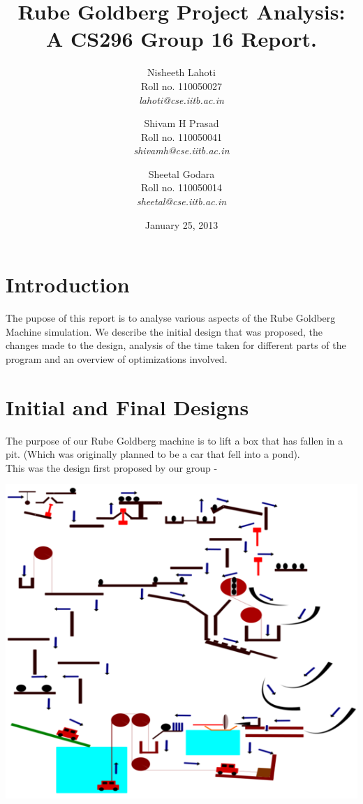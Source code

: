 \documentclass[a4paper,11pt]{article}
\begin{document}
	\title{\textbf{Rube Goldberg Project Analysis:\\ A CS296 Group 16 Report.}}
	
	\author {
		Nisheeth Lahoti\\ Roll no. 110050027\\ \emph{lahoti@cse.iitb.ac.in}
		\and Shivam H Prasad\\ Roll no. 110050041\\ \emph{shivamh@cse.iitb.ac.in}
		\and Sheetal Godara\\ Roll no. 110050014\\ \emph{sheetal@cse.iitb.ac.in}
	}
	
	\date{January 25, 2013}
	\maketitle
	
	\section{Introduction}
		The pupose of this report is to analyse various aspects of the Rube
		Goldberg Machine simulation. We describe the initial design that was
		proposed, the changes made to the design, analysis of the time taken for
		different parts of the program and an overview of optimizations involved.
	
	\section{Initial and Final Designs}
		The purpose of our Rube Goldberg machine is to lift a box that has fallen
		in a pit. (Which was originally planned to be  a car that fell into a
		pond).\\
		
		This was the design first proposed by our group -
			\begin{center}
				\includegraphics[scale=0.7]{./doc/images/initial_design.png}
			\end{center}
		
\end{document}
